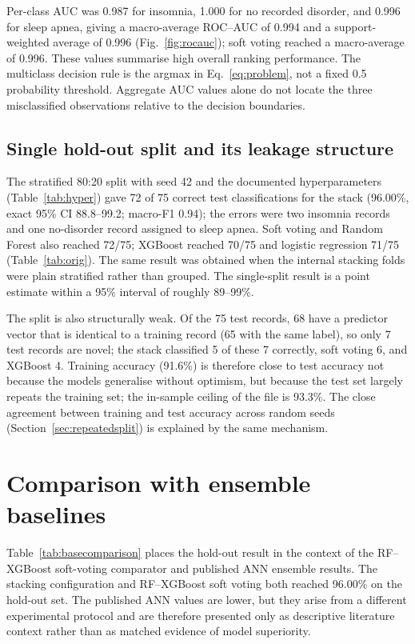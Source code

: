 \documentclass[a4paper,fleqn]{cas-dc}
\begin{document}
Per-class AUC was 0.987 for insomnia, 1.000 for no recorded disorder, and 0.996 for sleep apnea, giving a macro-average ROC--AUC of 0.994 and a support-weighted average of 0.996 (Fig.~\ref{fig:rocauc}); soft voting reached a macro-average of 0.996. These values summarise high overall ranking performance. The multiclass decision rule is the argmax in Eq.~\eqref{eq:problem}, not a fixed 0.5 probability threshold. Aggregate AUC values alone do not locate the three misclassified observations relative to the decision boundaries.

\subsection{Single hold-out split and its leakage structure}
\label{sec:reproduce}
The stratified 80:20 split with seed 42 and the documented hyperparameters (Table~\ref{tab:hyper}) gave 72 of 75 correct test classifications for the stack (96.00\%, exact 95\% CI 88.8--99.2; macro-F1 0.94); the errors were two insomnia records and one no-disorder record assigned to sleep apnea. Soft voting and Random Forest also reached 72/75; XGBoost reached 70/75 and logistic regression 71/75 (Table~\ref{tab:orig}). The same result was obtained when the internal stacking folds were plain stratified rather than grouped. The single-split result is a point estimate within a 95\% interval of roughly 89--99\%.

The split is also structurally weak. Of the 75 test records, 68 have a predictor vector that is identical to a training record (65 with the same label), so only 7 test records are novel; the stack classified 5 of these 7 correctly, soft voting 6, and XGBoost 4. Training accuracy (91.6\%) is therefore close to test accuracy not because the models generalise without optimism, but because the test set largely repeats the training set; the in-sample ceiling of the file is 93.3\%. The close agreement between training and test accuracy across random seeds (Section~\ref{sec:repeatedsplit}) is explained by the same mechanism.

\begin{table}[width=\textwidth,pos=!tbp]
\centering
\caption{The 80:20 split (seed 42): accuracy with exact Clopper--Pearson intervals, macro-F1, training accuracy, and accuracy on the 7 test records whose predictor vector does not appear in the training set.}
\label{tab:orig}
\small

\end{table}


\FloatBarrier
\section{Comparison with ensemble baselines}
\label{sec:comparison}
Table~\ref{tab:basecomparison} places the hold-out result in the context of the RF--XGBoost soft-voting comparator and published ANN ensemble results. The stacking configuration and RF--XGBoost soft voting both reached 96.00\% on the hold-out set. The published ANN values are lower, but they arise from a different experimental protocol and are therefore presented only as descriptive literature context rather than as matched evidence of model superiority.
\end{document}
